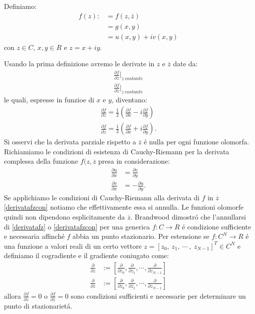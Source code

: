 \documentclass[a4paper,10pt]{article}
\begin{document}
Definiamo:
\begin{align}
 f(z) : &= f\left( z,\overline{z}\right)\\
 &= g\left( x,y\right)\\
 &= u\left( x,y\right) +iv\left( x,y\right)
\end{align}
con $z\in C$, $x,y\in R$ e $z=x+iy$. 

Usando la prima definizione avremo le derivate in $z$ e $\overline{z}$ date da:
\begin{align}
\frac{\partial f}{\partial z}\bigg|_{\overline{z} \ costante}\\
\frac{\partial f}{\partial \overline{z}}\bigg|_{z \ costante}
\end{align}
le quali, espresse in funzioe di $x$ e $y$, diventano:
\begin{align}
 \frac{\partial f}{\partial z} = \frac{1}{2}\left(\frac{\partial f}{\partial x}-i\frac{\partial f}{\partial y}\right)\label{derivatafz}\\
 \frac{\partial f}{\partial \overline{z}} = \frac{1}{2}\left(\frac{\partial f}{\partial x}+i\frac{\partial f}{\partial y}\right).\label{derivatafzcon}
\end{align}
Si osservi che la derivata parziale rispetto a $\overline{z}$ \'e nulla per ogni funzione olomorfa. Richiamiamo le condizioni di esistenza di Cauchy-Riemann per la derivata complessa della funzione $f(z,\overline{z}$ presa in considerazione:
\begin{align}
 \frac{\partial u}{\partial x} &= \frac{\partial v}{\partial y}\\
 \frac{\partial v}{\partial x} &=- \frac{\partial u}{\partial y}.
\end{align}
Se applichiamo le condizioni di Cauchy-Riemann alla derivata di $f$ in $\overline{z}$ \eqref{derivatafzcon} notiamo che effettivamente essa si annulla. Le funzioni olomorfe quindi non dipendono esplicitamente da $\overline{z}$. Brandwood dimostr\'o che l'annullarsi di \eqref{derivatafz} o \eqref{derivatafzcon} per una generica $f:C\rightarrow R$ \'e condizione sufficiente e necessaria affinch\'e $f$ abbia un punto stazionario. Per estensione se $f:C^N\rightarrow R$ \'e una funzione a valori reali di un certo vettore $z=\left[ z_0, \ z_1, \ \cdots \ , \ z_{N-1}\right]^T \in C^N$ e definiamo il cogradiente e il gradiente coniugato come:
\begin{align}
 \frac{\partial}{\partial z} &:=\left[ \frac{\partial}{\partial z_0},\frac{\partial}{\partial z_1},\cdots ,\frac{\partial}{\partial z_{N-1}}\right]\\
 \frac{\partial}{\partial z} &:=\left[ \frac{\partial}{\partial \overline{z_0}},\frac{\partial}{\partial \overline{z_1}},\cdots ,\frac{\partial}{\partial \overline{z_{N-1}}}\right]
\end{align}
allora $\frac{\partial f}{\partial z}=0$ o $\frac{\partial f}{\partial \overline{z}}=0$ sono condizioni sufficienti e necessarie per determinare un punto di stazionariet\'a. 
\end{document}

